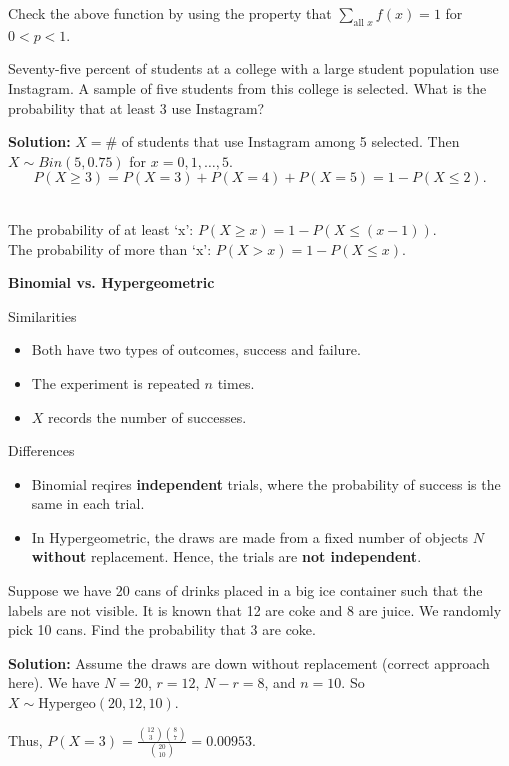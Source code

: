 \begin{remark}
    Check the above function by using the property that $\displaystyle \sum_{\text{all $x$}} f(x) = 1$ for $0 < p < 1$.
\end{remark}

\begin{example}
    Seventy-five percent of students at a college with a large student population use Instagram.
    A sample of five students from this college is selected. What is the probability that at least 3 use Instagram?

    \textbf{Solution:} $X = \#$ of students that use Instagram among 5 selected. Then $X \sim Bin(5,0.75)$ for $x=0,1,\ldots ,5$.
    \[P(X \geq 3) = P(X=3) + P(X=4) + P(X=5) = 1- P(X \leq 2).\]
\end{example}

\begin{remark}
    \phantom{}\\
    The probability of at least `x': $P(X \geq x) = 1 - P(X \leq (x-1))$. \\
    The probability of more than `x': $P(X > x) = 1 - P(X \leq x)$.
\end{remark}

\textbf{Binomial vs. Hypergeometric}

Similarities
\begin{itemize}
    \item Both have two types of outcomes, success and failure.
    \item The experiment is repeated $n$ times.
    \item $X$ records the number of successes.
\end{itemize}

Differences
\begin{itemize}
    \item Binomial reqires \textbf{independent} trials, where the probability of success is the same in each trial.
    \item In Hypergeometric, the draws are made from a fixed number of objects $N$ \textbf{without} replacement. Hence, the trials are \textbf{not independent}. \\
\end{itemize}

\begin{example}
    Suppose we have 20 cans of drinks placed in a big ice container such that the labels are not visible. It is known that 12
    are coke and 8 are juice. We randomly pick 10 cans. Find the probability that 3 are coke.

    \textbf{Solution:} Assume the draws are down without replacement (correct approach here). We have $N=20$, $r=12$, $N-r=8$, and $n=10$. So $X \sim \text{Hypergeo}(20, 12, 10)$.
    
    Thus, $P(X=3) = \frac{\binom{12}{3}\binom{8}{7}}{\binom{20}{10}} = 0.00953.$
\end{example}


